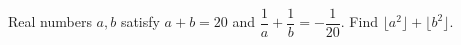 Real numbers $a,b$ satisfy $a+b=20$ and $\dfrac{1}{a}+\dfrac{1}{b}=-\dfrac{1}{20}$. Find $\lfloor a^2\rfloor+\lfloor b^2\rfloor$.
